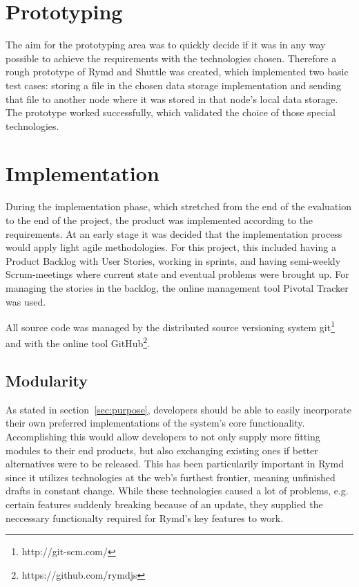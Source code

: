 \section{Prototyping}

The aim for the prototyping area was to quickly decide if it was in any way possible to achieve the requirements with the technologies chosen. Therefore a rough prototype of Rymd and Shuttle was created, which implemented two basic test cases: storing a file in the chosen data storage implementation and sending that file to another node where it was stored in that node's local data storage. The prototype worked successfully, which validated the choice of those special technologies.

\section{Implementation}

During the implementation phase, which stretched from the end of the evaluation to the end of the project, the product was implemented according to the requirements. At an early stage it was decided that the implementation process would apply light agile methodologies. For this project, this included having a Product Backlog with User Stories, working in sprints, and having semi-weekly Scrum-meetings where current state and eventual problems were brought up. For managing the stories in the backlog, the online management tool Pivotal Tracker was used.

All source code was managed by the distributed source versioning system git\footnote{http://git-scm.com/} and with the online tool GitHub\footnote{https://github.com/rymdjs}.

\subsection{Modularity}

As stated in section~\ref{sec:purpose}, developers should be able to easily incorporate their own preferred implementations of the system's core functionality. Accomplishing this would allow developers to not only supply more fitting modules to their end products, but also exchanging existing ones if better alternatives were to be released. This has been particularily important in Rymd since it utilizes technologies at the web's furthest frontier, meaning unfinished drafts in constant change. While these technologies caused a lot of problems, e.g. certain features suddenly breaking because of an update, they supplied the neccessary functionalty required for Rymd's key features to work.

